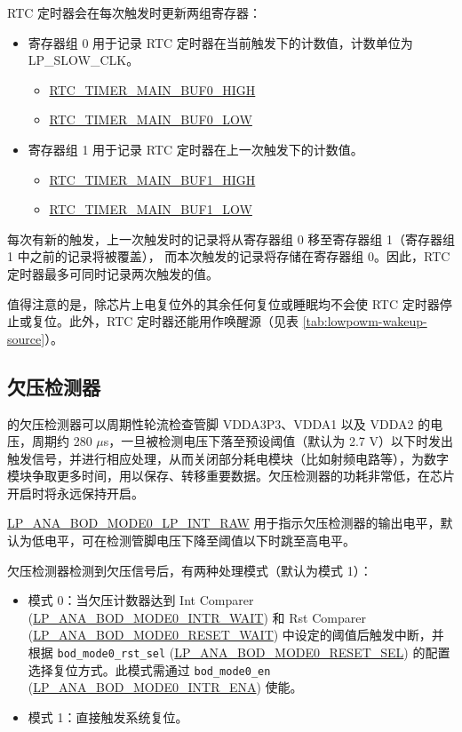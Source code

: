 \documentclass[main\_\_CN.tex]{subfiles}
\begin{document}
RTC 定时器会在每次触发时更新两组寄存器：
\begin{itemize}
    \item 寄存器组 0 用于记录 RTC 定时器在当前触发下的计数值，计数单位为 LP\_SLOW\_CLK。
    \begin{itemize}
        \item \hyperref[fielddesc:RTCTIMERMAINBUF0HIGH]{RTC\_TIMER\_MAIN\_BUF0\_HIGH}
        \item \hyperref[fielddesc:RTCTIMERMAINBUF0LOW]{RTC\_TIMER\_MAIN\_BUF0\_LOW}
    \end{itemize}
    \item 寄存器组 1 用于记录 RTC 定时器在上一次触发下的计数值。
    \begin{itemize}
    \item \hyperref[fielddesc:RTCTIMERMAINBUF1HIGH]{RTC\_TIMER\_MAIN\_BUF1\_HIGH}
    \item \hyperref[fielddesc:RTCTIMERMAINBUF1LOW]{RTC\_TIMER\_MAIN\_BUF1\_LOW}
    \end{itemize}
\end{itemize}

每次有新的触发，上一次触发时的记录将从寄存器组 0 移至寄存器组 1（寄存器组 1 中之前的记录将被覆盖），
而本次触发的记录将存储在寄存器组 0。因此，RTC 定时器最多可同时记录两次触发的值。

值得注意的是，除芯片上电复位外的其余任何复位或睡眠均不会使 RTC 定时器停止或复位。此外，RTC 定时器还能用作唤醒源（见表 \ref{tab:lowpowm-wakeup-source}）。

\subsection{欠压检测器}

\chipname{} 的欠压检测器可以周期性轮流检查管脚 VDDA3P3、VDDA1 以及 VDDA2 的电压，周期约 280 $\mu$s，一旦被检测电压下落至预设阈值（默认为 2.7 V）以下时发出触发信号，并进行相应处理，从而关闭部分耗电模块（比如射频电路等），为数字模块争取更多时间，用以保存、转移重要数据。欠压检测器的功耗非常低，在芯片开启时将永远保持开启。

\hyperref[fielddesc:LPANABODMODE0LPINTRAW]{LP\_ANA\_BOD\_MODE0\_LP\_INT\_RAW} 用于指示欠压检测器的输出电平，默认为低电平，可在检测管脚电压下降至阈值以下时跳至高电平。

欠压检测器检测到欠压信号后，有两种处理模式（默认为模式 1）：

\begin{itemize}
    \item 模式 0：当欠压计数器达到 Int Comparer (\hyperref[fielddesc:LPANABODMODE0INTRWAIT]{LP\_ANA\_BOD\_MODE0\_INTR\_WAIT}) 和 Rst Comparer (\hyperref[fielddesc:LPANABODMODE0RESETWAIT]{LP\_ANA\_BOD\_MODE0\_RESET\_WAIT}) 中设定的阈值后触发中断，并根据 \texttt{bod\_mode0\_rst\_sel} (\hyperref[fielddesc:LPANABODMODE0RESETSEL]{LP\_ANA\_BOD\_MODE0\_RESET\_SEL}) 的配置选择复位方式。此模式需通过 \texttt{bod\_mode0\_en} (\hyperref[fielddesc:LPANABODMODE0INTRENA]{LP\_ANA\_BOD\_MODE0\_INTR\_ENA}) 使能。
    \item 模式 1：直接触发系统复位。
\end{itemize}
\end{document}
